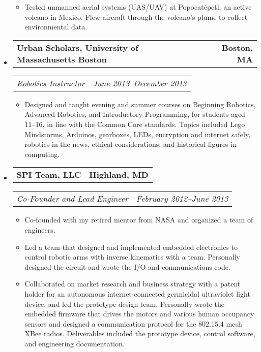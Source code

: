 \documentclass[10pt,letterpaper]{article}
\newcommand{\headerrow}[2]{%
    \begin{tabularx}{\linewidth}{Xr}
	    #1 & #2 \\
    \end{tabularx}
}
\begin{document}
\begin{itemize}
\begin{itemize}
        \item Tested unmanned aerial systems (UAS/UAV) at Popocatépetl, an active
            volcano in Mexico. Flew aircraft through the volcano's plume to
            collect environmental data.
    \end{itemize}

    \item
    \headerrow{\textbf{Urban Scholars, University of Massachusetts Boston}}
		{\textbf{Boston, MA}}
	\headerrow{\emph{Robotics Instructor}}{\emph{June 2013--December 2013}}
	\begin{itemize}
        \item Designed and taught evening and summer courses on Beginning
            Robotics, Advanced Robotics, and Introductory Programming, for
            students aged 11--16, in line with the Common Core standards.
            Topics included Lego Mindstorms, Arduinos, gearboxes, LEDs,
            encryption and internet safely, robotics in the news, ethical
            considerations, and historical figures in computing.
	\end{itemize}

	\item
	\headerrow{\textbf{SPI Team, LLC}}{\textbf{Highland, MD}}
	\headerrow{\emph{Co-Founder and Lead Engineer}}
		{\emph{February 2012--June 2013}}
	\begin{itemize}
        \item Co-founded with my retired mentor from NASA and organized a team
            of engineers.

        \item Led a team that designed and implemented embedded electronics to
            control robotic arms with inverse kinematics with a team.
            Personally designed the circuit and wrote the I/O and
            communications code.

        \item Collaborated on market research and business strategy with a
            patent holder for an autonomous internet-connected germicidal
            ultraviolet light device, and led the prototype design team.
            Personally wrote the embedded firmware that drives the motors and
            various human occupancy sensors and designed a communication
            protocol for the 802.15.4 mesh XBee radios.  Deliverables included
            the prototype device, control software, and engineering
            documentation.
	\end{itemize}


\end{itemize}
\end{document}
